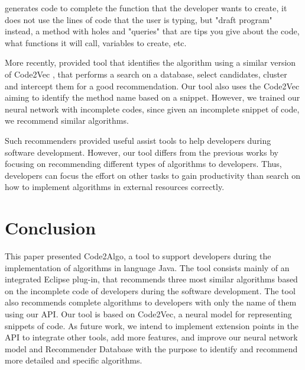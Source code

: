\documentclass[12pt]{article}
\begin{document}
\cite{Vijayaraghavan2017Bayou} generates code to complete the function that the developer wants to create, it does not use the lines of code that the user is typing, but "draft program" instead, a method with holes and "queries" that are tips you give about the code, what functions it will call, variables to create, etc. 

More recently, \cite{Luan2018Aroma} provided tool that identifies the algorithm using a similar version of Code2Vec \cite{Alon2018Code2vec}, that performs a search on a database, select candidates, cluster and intercept them for a good recommendation. Our tool also uses the Code2Vec aiming to identify the method name based on a snippet. However, we trained our neural network with incomplete codes, since given an incomplete snippet of code, we recommend similar algorithms.

Such recommenders provided useful assist tools to help developers during software development. However, our tool differs from the previous works by focusing on recommending different types of algorithms to developers. Thus, developers can focus the effort on other tasks to gain productivity than search on how to implement algorithms in external resources correctly. 


\section{Conclusion}
\label{sec:conclusion}

This paper presented Code2Algo, a tool to support developers during the implementation of algorithms in language Java. The tool consists mainly of an integrated Eclipse plug-in, that recommends three most similar algorithms based on the incomplete code of developers during the software development. The tool also recommends complete algorithms to developers with only the name of them using our API. Our tool is based on Code2Vec, a neural model for representing snippets of code. As future work, we intend to implement extension points in the API to integrate other tools, add more features,  and improve our neural network model and  Recommender Database with the purpose to identify and recommend more detailed and specific algorithms.



\end{document}
